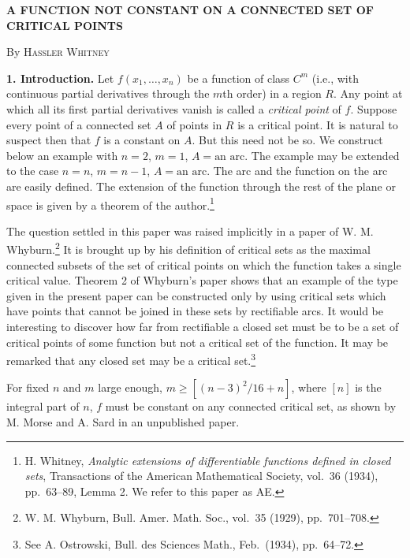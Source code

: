 \documentclass[11pt,a4paper,leqno,twoside]{article}
\newcommand{\sect}[1]{\par\medskip\noindent\textbf{#1}\enspace}
\begin{document}
\setcounter{page}{514}\thispagestyle{plain}
\begin{center}
\textbf{A FUNCTION NOT CONSTANT ON A CONNECTED SET OF\\ CRITICAL POINTS}\par\medskip
By \textsc{Hassler Whitney}
\end{center}
\begingroup\renewcommand{\thefootnote}{}\endgroup
\sect{1. Introduction.} Let $f(x_1,\ldots,x_n)$ be a function of class $C^m$ (i.e., with continuous partial derivatives through the $m$th order) in a region $R$. Any point at which all its first partial derivatives vanish is called a \textit{critical point} of $f$. Suppose every point of a connected set $A$ of points in $R$ is a critical point. It is natural to suspect then that $f$ is a constant on $A$. But this need not be so. We construct below an example with $n=2$, $m=1$, $A=\text{an arc}$. The example may be extended to the case $n=n$, $m=n-1$, $A=\text{an arc}$. The arc and the function on the arc are easily defined. The extension of the function through the rest of the plane or space is given by a theorem of the author.\footnote{H. Whitney, \textit{Analytic extensions of differentiable functions defined in closed sets}, Transactions of the American Mathematical Society, vol.\ 36 (1934), pp.\ 63--89, Lemma 2. We refer to this paper as AE.}

The question settled in this paper was raised implicitly in a paper of W. M. Whyburn.\footnote{W. M. Whyburn, Bull. Amer. Math. Soc., vol.\ 35 (1929), pp.\ 701--708.} It is brought up by his definition of critical sets as the maximal connected subsets of the set of critical points on which the function takes a single critical value. Theorem 2 of Whyburn's paper shows that an example of the type given in the present paper can be constructed only by using critical sets which have points that cannot be joined in these sets by rectifiable arcs. It would be interesting to discover how far from rectifiable a closed set must be to be a set of critical points of some function but not a critical set of the function. It may be remarked that any closed set may be a critical set.\footnote{See A. Ostrowski, Bull. des Sciences Math., Feb.\ (1934), pp.\ 64--72.}

For fixed $n$ and $m$ large enough, $m\geq[(n-3)^2/16+n]$, where $[n]$ is the integral part of $n$, $f$ must be constant on any connected critical set, as shown by M. Morse and A. Sard in an unpublished paper.
\end{document}
